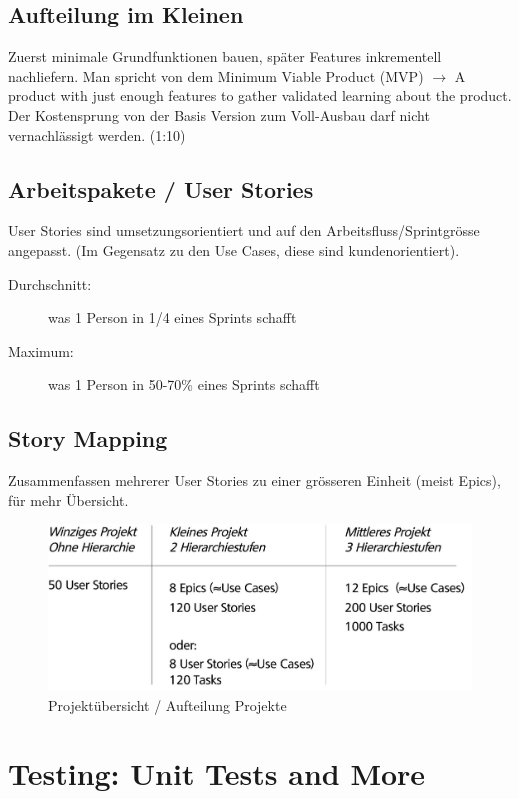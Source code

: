 \subsection{Aufteilung im Kleinen}
Zuerst minimale Grundfunktionen bauen, später Features inkrementell nachliefern. Man spricht von dem Minimum Viable Product (MVP) $\rightarrow$ A product with just enough features to gather validated learning about the product. Der Kostensprung von der Basis Version zum Voll-Ausbau darf nicht vernachlässigt werden. (1:10)

\subsection{Arbeitspakete / User Stories}
User Stories sind umsetzungsorientiert und auf den Arbeitsfluss/Sprintgrösse angepasst. (Im Gegensatz zu den Use Cases, diese sind kundenorientiert). 

\begin{description}
	\item[Durchschnitt:] was 1 Person in 1/4 eines Sprints schafft
	\item[Maximum:] was 1 Person in 50-70\% eines Sprints schafft
\end{description}


\subsection{Story Mapping}
Zusammenfassen mehrerer User Stories zu einer grösseren Einheit (meist Epics), für mehr Übersicht. 


\begin{figure}[h!]
	\centering
	\includegraphics[width=0.6\linewidth]{img/projektuebersicht}
	\caption{Projektübersicht / Aufteilung Projekte}
	\label{fig:projektuebersicht}
\end{figure}



\section{Testing: Unit Tests and More}

